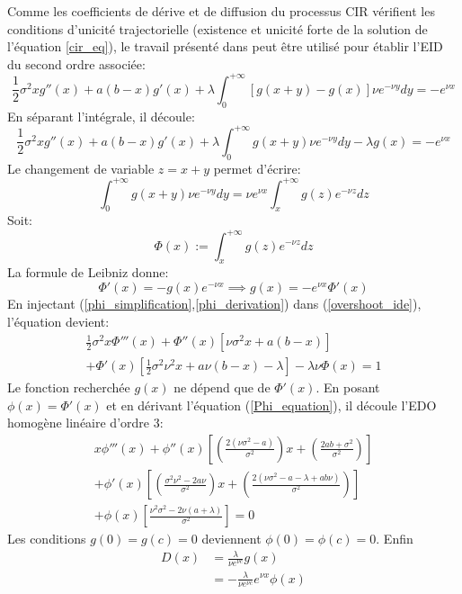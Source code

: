 Comme les coefficients de dérive et de diffusion du processus \acs{CIR} vérifient les conditions d'unicité trajectorielle (existence et unicité forte de la solution de l'équation \ref{cir_eq}), le travail présenté dans\cite{abundo2013} peut être utilisé pour établir l'\acs{EID} du second ordre associée:
\begin{equation}\label{initial_overshoot_ide}
    \frac{1}{2}\sigma^2xg''(x)+a(b-x)g'(x)+\lambda\int_0^{+\infty}\left[g(x+y)-g(x)\right]\nu e^{-\nu y}dy=-e^{\nu x}
\end{equation}
En séparant l'intégrale, il découle:
\begin{equation}\label{overshoot_ide}
        \frac{1}{2}\sigma^2xg''(x)+a(b-x)g'(x)+\lambda\int_0^{+\infty}g(x+y)\nu e^{-\nu y}dy-\lambda g(x)=-e^{\nu x}
\end{equation}
Le changement de variable $z=x+y$ permet d'écrire:
\[
\int_0^{+\infty}g(x+y)\nu e^{-\nu y}dy=\nu e^{\nu x}\int_x^{+\infty}g(z)e^{-\nu z}dz
\]
Soit:
\begin{equation}\label{phi_simplification}
    \Phi(x):=\int_x^{+\infty}g(z)e^{-\nu z}dz
\end{equation}
La formule de Leibniz donne:
\begin{equation}\label{phi_derivation}
        \Phi'(x)=-g(x)e^{-\nu x}\implies g(x)=-e^{\nu x}\Phi'(x)
\end{equation}
En injectant (\ref{phi_simplification},\ref{phi_derivation}) dans (\ref{overshoot_ide}), l'équation devient:
\begin{equation}\label{Phi_equation}
    \begin{aligned}
        \frac{1}{2}\sigma^2x\Phi'''(x)+\Phi''(x)\left[\nu\sigma^2x+a(b-x)\right]\\+\Phi'(x)\left[\frac{1}{2}\sigma^2\nu^2x+a\nu(b-x)-\lambda\right]-\lambda\nu \Phi(x)=1
    \end{aligned}
\end{equation}
Le fonction recherchée $g(x)$ ne dépend que de $\Phi'(x)$. En posant $\phi(x)=\Phi'(x)$ et en dérivant l'équation (\ref{Phi_equation}), il découle l'\acs{EDO} homogène linéaire d'ordre 3:
\begin{equation}\label{phi_equation}
    \begin{aligned}
        x \phi'''(x)+\phi''(x) \left[\left(\frac{2(\nu\sigma^2-a)}{\sigma^2}\right)x+\left(\frac{2ab+\sigma^2}{\sigma^2}\right)\right]\\+\phi'(x) \left[\left(\frac{\sigma^2\nu^2-2a\nu}{\sigma^2}\right)x+\left(\frac{2(\nu\sigma^2-a-\lambda+ab\nu)}{\sigma^2}\right)\right]\\+\phi(x) \left[\frac{\nu^2  \sigma ^2-2\nu(a+\lambda )}{\sigma^2}\right]=0
    \end{aligned}
\end{equation}
Les conditions $g(0)=g(c)=0$ deviennent $\phi(0)=\phi(c)=0$. Enfin
\[
\begin{aligned}
    D(x) &= \frac{\lambda}{\nu e^{\nu c}}g(x)\\
    &=-\frac{\lambda}{\nu e^{\nu c}}e^{\nu x}\phi(x)
\end{aligned}
\]


